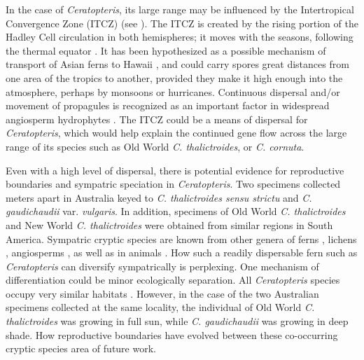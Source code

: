 \documentclass[12pt]{article}
\begin{document}
\begin{flushleft}
In the case of \textit{Ceratopteris}, its large range may be influenced by the Intertropical Convergence Zone (ITCZ) (see \cite{Dettmann1992, LloydTax1974, Schneider2014}). The ITCZ is created by the rising portion of the Hadley Cell circulation in both hemispheres; it moves with the seasons, following the thermal equator \cite{Schneider2014}. It has been hypothesized as a possible mechanism of transport of Asian ferns to Hawaii \autocite{Geiger2007}, and could carry spores great distances from one area of the tropics to another, provided they make it high enough into the atmosphere, perhaps by monsoons or hurricanes. Continuous dispersal and/or movement of propagules is recognized as an important factor in widespread angiosperm hydrophytes \autocite{Les2003, Spalik2014}. The ITCZ could be a means of dispersal for \textit{Ceratopteris}, which would help explain the continued gene flow across the large range of its species such as Old World \textit{C. thalictroides}, or \textit{C. cornuta}. 

Even with a high level of dispersal, there is potential evidence for reproductive boundaries and sympatric speciation in \textit{Ceratopteris}. Two specimens collected meters apart in Australia keyed to \textit{C. thalictroides sensu strictu} and \textit{C. gaudichaudii} var. \textit{vulgaris}. In addition, specimens of Old World \textit{C. thalictroides} and New World \textit{C. thalictroides} were obtained from similar regions in South America. Sympatric cryptic species are known from other genera of ferns \autocite{Patel2019, Yatabe2009}, lichens \autocite{Del_Carmen_Molina2011}, angiosperms \autocite{Les2015, Soltis2007}, as well as in animals \autocite{Amor2014, Hebert2004, Nygren2014}. How such a readily dispersable fern such as \textit{Ceratopteris} can diversify sympatrically is perplexing. One mechanism of differentiation could be minor ecologically separation. All \textit{Ceratopteris} species occupy very similar habitats \autocite{LloydTax1974, Masuyama2010}. However, in the case of the two Australian specimens collected at the same locality, the individual of Old World \textit{C. thalictroides} was growing in full sun, while \textit{C. gaudichaudii} was growing in deep shade. How reproductive boundaries have evolved between these co-occurring cryptic species area of future work.


\end{flushleft}
\end{document}
